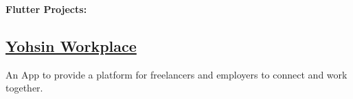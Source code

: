 \documentclass[]{m abbas resume' 2022}
\begin{document}
\begin{minipage}[t]{0.45\textwidth}

    \textbf{Flutter Projects:}\\
    
    
    
    
    
    \subsection{\href{https://github.com/smabbasht/yohsin-workplace}{\textbf{Yohsin Workplace}}}
    An App to provide a platform for freelancers and employers to connect and work together.


\end{minipage}
\end{document}
